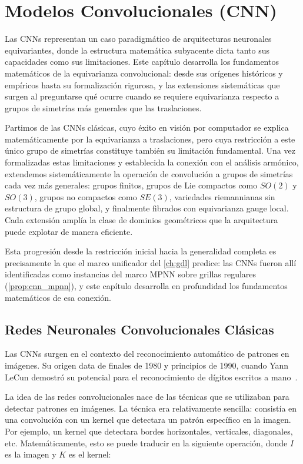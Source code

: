 \chapter{Modelos Convolucionales (CNN)}\label{ch:cnn}

Las \glspl{CNN} representan un caso paradigmático de arquitecturas neuronales equivariantes, donde la estructura matemática subyacente dicta tanto sus capacidades como sus limitaciones. Este capítulo desarrolla los fundamentos matemáticos de la equivarianza convolucional: desde sus orígenes históricos y empíricos hasta su formalización rigurosa, y las extensiones sistemáticas que surgen al preguntarse qué ocurre cuando se requiere equivarianza respecto a grupos de simetrías más generales que las traslaciones.

Partimos de las \glspl{CNN} clásicas, cuyo éxito en visión por computador se explica matemáticamente por la equivarianza a traslaciones, pero cuya restricción a este único grupo de simetrías constituye también su limitación fundamental. Una vez formalizadas estas limitaciones y establecida la conexión con el análisis armónico, extendemos sistemáticamente la operación de convolución a grupos de simetrías cada vez más generales: grupos finitos, grupos de Lie compactos como $SO(2)$ y $SO(3)$, grupos no compactos como $SE(3)$, variedades riemannianas sin estructura de grupo global, y finalmente fibrados con equivarianza gauge local. Cada extensión amplía la clase de dominios geométricos que la arquitectura puede explotar de manera eficiente.

Esta progresión desde la restricción inicial hacia la generalidad completa es precisamente la que el marco unificador del \autoref{ch:gdl} predice: las \glspl{CNN} fueron allí identificadas como instancias del marco \gls{MPNN} sobre grillas regulares (\autoref{prop:cnn_mpnn}), y este capítulo desarrolla en profundidad los fundamentos matemáticos de esa conexión.

\section{Redes Neuronales Convolucionales Clásicas}\label{sec:cnn_clasicas}

Las \glspl{CNN} surgen en el contexto del reconocimiento automático de patrones en imágenes. Su origen data de finales de 1980 y principios de 1990, cuando Yann LeCun demostró su potencial para el reconocimiento de dígitos escritos a mano~\citep{lecun1989}.

La idea de las redes convolucionales nace de las técnicas que se utilizaban para detectar patrones en imágenes. La técnica era relativamente sencilla: consistía en una convolución con un kernel que detectara un patrón específico en la imagen. Por ejemplo, un kernel que detectara bordes horizontales, verticales, diagonales, etc. Matemáticamente, esto se puede traducir en la siguiente operación, donde \(I\) es la imagen y \(K\) es el kernel:

